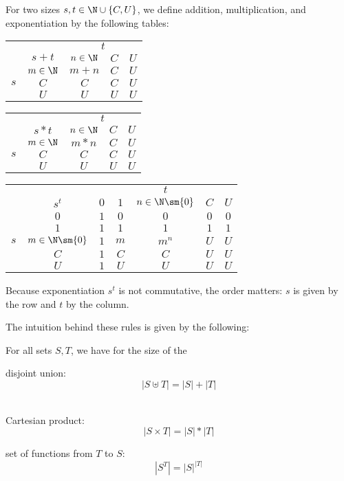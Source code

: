 \begin{definition}\label{def:setsizecomp}
For two sizes $s,t\in \N\cup\{C,U\}$, we define addition, multiplication, and exponentiation by the following tables:

\begin{center}
\begin{tabular}{cc|ccc}
      &           & \multicolumn{3}{c}{$t$} \\
      & $s+t$ & $n\in \N$ & $C$ & $U$ \\
\hline
      & $m\in \N$ & $m+n$ & $C$ & $U$ \\ 
$s$   & $C$       & $C$   & $C$ & $U$ \\
      & $U$       & $U$   & $U$ & $U$
\end{tabular}
\tb\tb
\begin{tabular}{cc|ccc}
      &           & \multicolumn{3}{c}{$t$} \\
      & $s*t$     & $n\in \N$ & $C$ & $U$ \\
\hline
      & $m\in \N$ & $m*n$ & $C$ & $U$ \\ 
$s$   & $C$       & $C$   & $C$ & $U$ \\
      & $U$       & $U$   & $U$ & $U$
\end{tabular}

\begin{tabular}{cc|ccccc}
      &                  & \multicolumn{5}{c}{$t$} \\
      & $s^t$            & $0$ & $1$ & $n\in\N\sm\{0\}$ & $C$ & $U$ \\
\hline
      & $0$              & $1$ & $0$ & $0$ & $0$ & $0$ \\ 
      & $1$              & $1$ & $1$ & $1$ & $1$ & $1$ \\ 
$s$   & $m\in\N\sm\{0\}$ & $1$ & $m$ &$m^n$& $U$ & $U$ \\ 
      & $C$              & $1$ & $C$ & $C$ & $U$ & $U$ \\
      & $U$              & $1$ & $U$ & $U$ & $U$ & $U$
\end{tabular}
\end{center}
Because exponentiation $s^t$ is not commutative, the order matters: $s$ is given by the row and $t$ by the column.
\end{definition}

The intuition behind these rules is given by the following:
\begin{theorem}
For all sets $S,T$, we have for the size of the
\begin{compactitem}
 \item disjoint union: \[|S \uplus T| = |S| + |T|\]\
 \item Cartesian product: \[|S\times T| = |S| * |T|\]
 \item set of functions from $T$ to $S$: \[|S^T| = |S| ^{|T|}\]
\end{compactitem}
\end{theorem}

